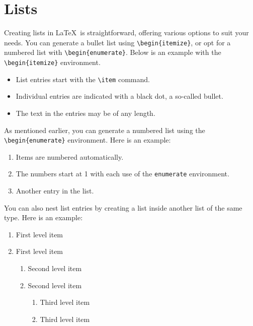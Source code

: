 {	\section{Lists}
	Creating lists in \LaTeX\ is straightforward, offering various options to suit your needs. You can generate a bullet list using \verb|\begin{itemize}|, or opt for a numbered list with \verb|\begin{enumerate}|. Below is an example with the \verb|\begin{itemize}| environment.

	\begin{itemize}
		\item List entries start with the \verb|\item| command.
		\item Individual entries are indicated with a black dot, a so-called bullet.
		\item The text in the entries may be of any length.
	\end{itemize}

	As mentioned earlier, you can generate a numbered list using the \verb|\begin{enumerate}| environment. Here is an example:

	\begin{enumerate}
		\item Items are numbered automatically.
		\item The numbers start at 1 with each use of the \verb|enumerate| environment.
		\item Another entry in the list.
	\end{enumerate}

	You can also nest list entries by creating a list inside another list of the same type. Here is an example:

	\begin{enumerate}
		\item First level item
		\item First level item
		      \begin{enumerate}
			      \item Second level item
			      \item Second level item
			            \begin{enumerate}
				            \item Third level item
				            \item Third level item
			            \end{enumerate}
		      \end{enumerate}
	\end{enumerate}

}
